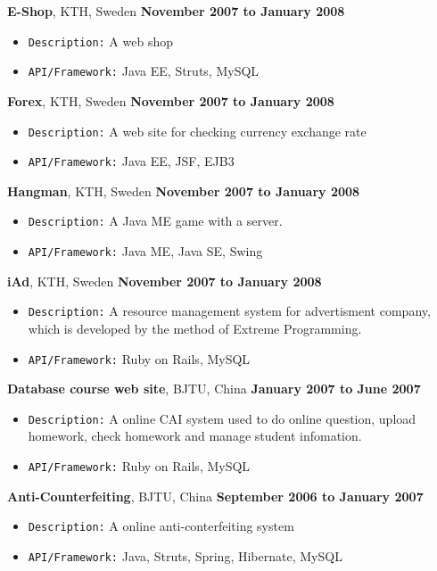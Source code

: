 \documentclass[10pt]{article}
\newenvironment{outerlist}[1][\enskip\textbullet]%
        {\begin{itemize}[#1]}{\end{itemize}%
         \vspace{-.6\baselineskip}}
\newcommand{\blankline}{\quad\pagebreak[2]}
\begin{document}
\blankline

\textbf{E-Shop}, KTH, Sweden \hfill \textbf{November 2007 to January 2008}
\begin{outerlist}
\item \texttt{Description:}
A web shop
\item \texttt{API/Framework:}
Java EE, Struts, MySQL
\end{outerlist}

\blankline

\textbf{Forex}, KTH, Sweden \hfill \textbf{November 2007 to January 2008}
\begin{outerlist}
\item \texttt{Description:}
A web site for checking currency exchange rate
\item \texttt{API/Framework:}
Java EE, JSF, EJB3
\end{outerlist}

\blankline

\textbf{Hangman}, KTH, Sweden \hfill \textbf{November 2007 to January 2008}
\begin{outerlist}
\item \texttt{Description:}
A Java ME game with a server.
\item \texttt{API/Framework:}
Java ME, Java SE, Swing
\end{outerlist}

\blankline

\textbf{iAd}, KTH, Sweden \hfill \textbf{November 2007 to January 2008}
\begin{outerlist}
\item \texttt{Description:}
A resource management system for advertisment company, which is developed by the method of Extreme Programming.
\item \texttt{API/Framework:}
Ruby on Rails, MySQL
\end{outerlist}

\blankline

\textbf{Database course web site}, BJTU, China \hfill \textbf{January 2007 to June 2007}
\begin{outerlist}
\item \texttt{Description:}
A online CAI system used to do online question, upload homework, check homework and manage student infomation.
\item \texttt{API/Framework:}
Ruby on Rails, MySQL
\end{outerlist}

\blankline

\textbf{Anti-Counterfeiting}, BJTU, China \hfill \textbf{September 2006 to January 2007}
\begin{outerlist}
\item \texttt{Description:}
A online anti-conterfeiting system
\item \texttt{API/Framework:}
Java, Struts, Spring, Hibernate, MySQL
\end{outerlist}
\end{document}
